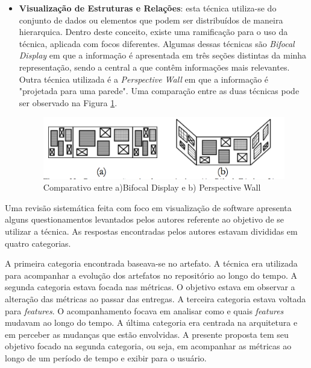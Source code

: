 \begin{itemize}
\item \textbf{Visualização de Estruturas e Relações}: esta técnica utiliza-se do conjunto de dados ou elementos que podem ser distribuídos de maneira hierarquica. Dentro deste conceito, existe uma ramificação para o uso da técnica, aplicada com focos diferentes. Algumas dessas técnicas são \textit{Bifocal Display} em que a informação é apresentada em três seções distintas da minha representação, sendo a central a que contêm informações mais relevantes. Outra técnica utilizada é a \textit{Perspective Wall} em que a informação é "projetada para uma parede". Uma comparação entre as duas técnicas pode ser observado na Figura \ref{img:comparativo}.
\graphicspath{{figuras/}}
\begin{figure}[h!]
\centering
\includegraphics[scale=0.5]{Bifocal_Wall}
\caption{Comparativo entre a)Bifocal Display e b) Perspective Wall}
\label{img:comparativo}
\end{figure}
%
\end{itemize}
Uma revisão sistemática feita com foco em visualização de software \cite{salameh_software_2016} apresenta alguns questionamentos levantados pelos autores referente ao objetivo de se utilizar a técnica. As respostas encontradas pelos autores estavam divididas em quatro categorias. 

A primeira categoria encontrada baseava-se no artefato. A técnica era utilizada para acompanhar a evolução dos artefatos no repositório ao longo do tempo. A segunda categoria estava focada nas métricas. O objetivo estava em observar a alteração das métricas ao passar das entregas. A terceira categoria estava voltada para \textit{features}. O acompanhamento focava em analisar como e quais \textit{features} mudavam ao longo do tempo. A última categoria era centrada na arquitetura e em perceber as mudanças que estão envolvidas. A presente proposta tem seu objetivo focado na segunda categoria, ou seja, em acompanhar as métricas ao longo de um período de tempo e exibir para o usuário.

